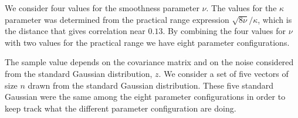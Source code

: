 We consider four values for the 
smoothness parameter $\nu$. 
The values for the $\kappa$ parameter 
was determined from the practical range 
expression $\sqrt{8\nu}/\kappa$, which is the 
distance that gives correlation near $0.13$. 
By combining the four values for $\nu$ with two 
values for the practical range we have 
eight parameter configurations. 
\begin{knitrout}
\color{fgcolor}\begin{kframe}
\begin{alltt}
 \hlkwb{<-} \hlstd{(}\hlstd{,}\hlstd{,}\hlstd{,}\hlstd{)}
 \hlkwb{=} \hlstd{(}\hlstd{,}\hlstd{)}
 \hlkwb{<-} \hlstd{(}\hlstd{(}\hlopt{*}\hlopt{/}\hlstd{pract.range[}\hlstd{],}
           \hlstd{(}\hlopt{*}\hlopt{/}\hlstd{pract.range[}\hlstd{])}
 \hlkwb{<-} \hlstd{(}\hlstd{=} 
                \hlstd{=} \hlstd{=}
\end{alltt}
\end{kframe}
\end{knitrout}

The sample value depends on the covariance  
matrix and on the noise considered 
from the standard Gaussian distribution, $z$. 
We consider a set of five vectors of size $n$ 
drawn from the standard Gaussian distribution. 
These five standard Gaussian were the same 
among the eight parameter configurations 
in order to keep track what the different 
parameter configuration are doing. 
\begin{knitrout}
\color{fgcolor}\begin{kframe}
\begin{alltt}
\hlstd{(}\hlstd{)}
 \hlkwb{<-} \hlstd{(}\hlstd{(}\hlopt{*}\hlstd{),} \hlstd{=}\hlstd{)}
\end{alltt}
\end{kframe}
\end{knitrout}

